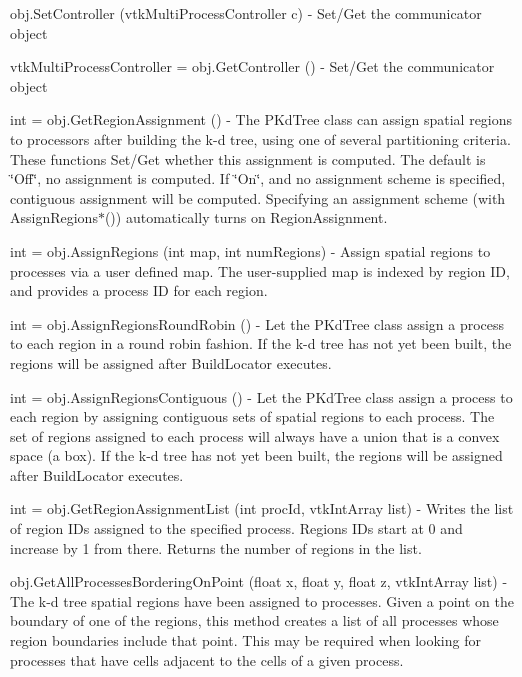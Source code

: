 \begin{DoxyItemize}
\item {\ttfamily obj.\-Set\-Controller (vtk\-Multi\-Process\-Controller c)} -\/ Set/\-Get the communicator object  
\item {\ttfamily vtk\-Multi\-Process\-Controller = obj.\-Get\-Controller ()} -\/ Set/\-Get the communicator object  
\item {\ttfamily int = obj.\-Get\-Region\-Assignment ()} -\/ The P\-Kd\-Tree class can assign spatial regions to processors after building the k-\/d tree, using one of several partitioning criteria. These functions Set/\-Get whether this assignment is computed. The default is \char`\"{}\-Off\char`\"{}, no assignment is computed. If \char`\"{}\-On\char`\"{}, and no assignment scheme is specified, contiguous assignment will be computed. Specifying an assignment scheme (with Assign\-Regions$\ast$()) automatically turns on Region\-Assignment.  
\item {\ttfamily int = obj.\-Assign\-Regions (int map, int num\-Regions)} -\/ Assign spatial regions to processes via a user defined map. The user-\/supplied map is indexed by region I\-D, and provides a process I\-D for each region.  
\item {\ttfamily int = obj.\-Assign\-Regions\-Round\-Robin ()} -\/ Let the P\-Kd\-Tree class assign a process to each region in a round robin fashion. If the k-\/d tree has not yet been built, the regions will be assigned after Build\-Locator executes.  
\item {\ttfamily int = obj.\-Assign\-Regions\-Contiguous ()} -\/ Let the P\-Kd\-Tree class assign a process to each region by assigning contiguous sets of spatial regions to each process. The set of regions assigned to each process will always have a union that is a convex space (a box). If the k-\/d tree has not yet been built, the regions will be assigned after Build\-Locator executes.  
\item {\ttfamily int = obj.\-Get\-Region\-Assignment\-List (int proc\-Id, vtk\-Int\-Array list)} -\/ Writes the list of region I\-Ds assigned to the specified process. Regions I\-Ds start at 0 and increase by 1 from there. Returns the number of regions in the list.  
\item {\ttfamily obj.\-Get\-All\-Processes\-Bordering\-On\-Point (float x, float y, float z, vtk\-Int\-Array list)} -\/ The k-\/d tree spatial regions have been assigned to processes. Given a point on the boundary of one of the regions, this method creates a list of all processes whose region boundaries include that point. This may be required when looking for processes that have cells adjacent to the cells of a given process.  

\end{DoxyItemize}
